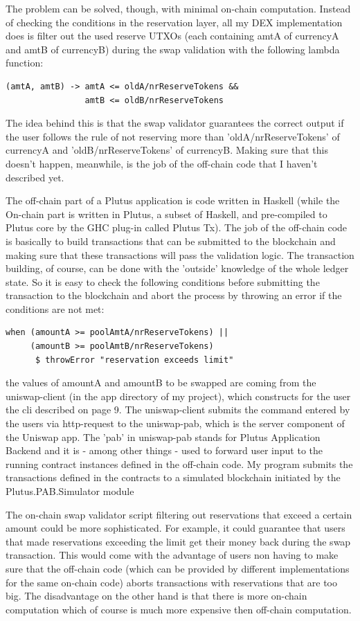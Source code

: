 \documentclass[a4paper,twoside,12pt]{report}
\begin{document}
The problem can be solved, though, with minimal on-chain computation. Instead of checking the conditions in the reservation layer, all my DEX implementation does is filter out the used reserve UTXOs (each containing amtA of currencyA and amtB of currencyB) during the swap validation with the following lambda function:
\begin{verbatim}
(amtA, amtB) -> amtA <= oldA/nrReserveTokens && 
                amtB <= oldB/nrReserveTokens
\end{verbatim}
The idea behind this is that the swap validator guarantees the correct output if the user follows the rule of not reserving more than 'oldA/nrReserveTokens' of currencyA and 'oldB/nrReserveTokens' of currencyB. Making sure that this doesn't happen, meanwhile, is the job of the off-chain code that I haven't described yet. 

The off-chain part of a Plutus application is code written in Haskell (while the On-chain part is written in Plutus, a subset of Haskell, and pre-compiled to Plutus core by the GHC plug-in called Plutus Tx). The job of the off-chain code is basically to build transactions that can be submitted to the blockchain and making sure that these transactions will pass the validation logic. The transaction building, of course, can be done with the 'outside' knowledge of the whole ledger state. So it is easy to check the following conditions before submitting the transaction to the blockchain and abort the process by throwing an error if the conditions are not met:
\begin{verbatim}
when (amountA >= poolAmtA/nrReserveTokens) || 
     (amountB >= poolAmtB/nrReserveTokens) 
      $ throwError "reservation exceeds limit"
\end{verbatim}
the values of amountA and amountB to be swapped are coming from the uniswap-client (in the app directory of my project), which constructs for the user the cli described on page 9. The uniswap-client submits the command entered by the users via http-request to the uniswap-pab, which is the server component of the Uniswap app. The 'pab' in uniswap-pab stands for Plutus Application Backend \cite{iogPAB} and it is - among other things - used to forward user input to the running contract instances defined in the off-chain code. My program submits the transactions defined in the contracts to a simulated blockchain initiated by the Plutus.PAB.Simulator module \cite{iogPabSimulation}

The on-chain swap validator script filtering out reservations that exceed a certain amount could be more sophisticated. For example, it could guarantee that users that made reservations exceeding the limit get their money back during the swap transaction. This would come with the advantage of users non having to make sure that the off-chain code (which can be provided by different implementations for the same on-chain code) aborts transactions with reservations that are too big. The disadvantage on the other hand is that there is more on-chain computation which of course is much more expensive then off-chain computation.
\end{document}
